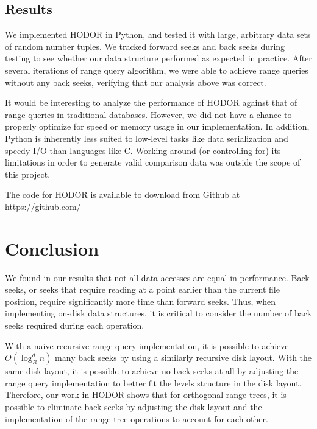 \documentclass[11pt, oneside]{article}
\begin{document}
\subsection{Results}

We implemented HODOR in Python, and tested it with large, arbitrary data sets of
random number tuples. We tracked forward seeks and back seeks during testing to
see whether our data structure performed as expected in practice. After several 
iterations of range query algorithm, we were able to achieve range queries
without any back seeks, verifying that our analysis above was correct. 

It would be interesting to analyze the performance of HODOR against that of
range queries in traditional databases. However, we did not have a chance to
properly optimize for speed or memory usage in our implementation. In addition,
Python is inherently less suited to low-level tasks like data serialization and
speedy I/O than languages like C. Working around (or controlling for) its
limitations in order to generate valid comparison data was outside the scope of
this project. 

The code for HODOR is available to download from Github at
https://github.com/%

\section{Conclusion}

    
We found in our results that not all data accesses are equal in performance.
Back seeks, or seeks that require reading at a point earlier than the current
file position, require significantly more time than forward seeks. Thus, when
implementing on-disk data structures, it is critical to consider the number of
back seeks required during each operation. 

With a naive recursive range query implementation, it is possible to
achieve $O(\log_B^d n)$ many back seeks by using a similarly recursive disk
layout. With the same disk layout, it is possible to achieve no back seeks at
all by adjusting the range query implementation to better fit the levels
structure in the disk layout. Therefore, our work in HODOR shows that for
orthogonal range trees, it is possible to eliminate back seeks by adjusting the
disk layout and the implementation of the range tree operations to account for
each other. 
\end{document}
